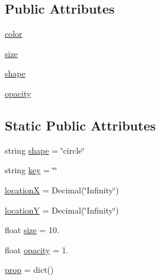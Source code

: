 \subsection*{Public Attributes}
\begin{DoxyCompactItemize}
\item 
\mbox{\hyperlink{class_bridges_1_1element__visualizer_1_1_element_visualizer_adb59ea72f9824578f3c2e8946dd4d588}{color}}
\item 
\mbox{\hyperlink{class_bridges_1_1element__visualizer_1_1_element_visualizer_accfe9e47f83d470165a8bfa8d1ef57c2}{size}}
\item 
\mbox{\hyperlink{class_bridges_1_1element__visualizer_1_1_element_visualizer_adb388088c26e6d232e3eb1e01f4c1bb6}{shape}}
\item 
\mbox{\hyperlink{class_bridges_1_1element__visualizer_1_1_element_visualizer_a8dff1d79beb3adc84e1f7a2d251415f3}{opacity}}
\end{DoxyCompactItemize}
\subsection*{Static Public Attributes}
\begin{DoxyCompactItemize}
\item 
string \mbox{\hyperlink{class_bridges_1_1element__visualizer_1_1_element_visualizer_a5bd4e1803cba20426bd7cb60edcee420}{shape}} = \char`\"{}circle\char`\"{}
\item 
string \mbox{\hyperlink{class_bridges_1_1element__visualizer_1_1_element_visualizer_a7fca8f05f8ca3cab859616f0343a7c5d}{key}} = \char`\"{}\char`\"{}
\item 
\mbox{\hyperlink{class_bridges_1_1element__visualizer_1_1_element_visualizer_a51873c21c714a0a309254417ced7feee}{locationX}} = Decimal(\char`\"{}Infinity\char`\"{})
\item 
\mbox{\hyperlink{class_bridges_1_1element__visualizer_1_1_element_visualizer_a59ea4d6ddad480cc3d014914cf64c35e}{locationY}} = Decimal(\char`\"{}Infinity\char`\"{})
\item 
float \mbox{\hyperlink{class_bridges_1_1element__visualizer_1_1_element_visualizer_a310edf0712e14c6d01264ca050166872}{size}} = 10.
\item 
float \mbox{\hyperlink{class_bridges_1_1element__visualizer_1_1_element_visualizer_a8c32a4ec0b2de8d90dc9ba32a60d3d31}{opacity}} = 1.
\item 
\mbox{\hyperlink{class_bridges_1_1element__visualizer_1_1_element_visualizer_a9eabc54da2fc1d0d04b9959d853cadbd}{prop}} = dict()
\end{DoxyCompactItemize}


